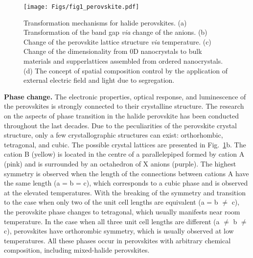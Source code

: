 \documentclass[journal=chreay,manuscript=review]{achemso}
\begin{document}
\begin{figure}[h!]
    \centering
    \texttt{[image: Figs/fig1\_perovskite.pdf]}
    \caption{
    Transformation mechanisms for halide perovskites. (a) Transformation of the band gap \textit{via} change of the anions. (b) Change of the perovskite lattice structure \textit{via} temperature. (c) Change of the dimensionality from 0D nanocrystals to bulk materials and supperlattices assembled from ordered nanocrystals. (d) The concept of spatial composition control by the application of external electric field and light due to segregation. %
    }
    \label{fig:pero1}
\end{figure}

%
\textbf{Phase change.}
The electronic properties, optical response, and luminescence of the perovskites is strongly connected to their crystalline structure. The research on the aspects of phase transition in the halide perovskite has been conducted throughout the last decades\cite{hirotsu1971experimental, hirotsu1974structural, hirotsu1978elastic, fujii1974neutron,tovborg1969nqr}. 
Due to the peculiarities of the perovskite crystal structure, only a few crystallographic structures can exist: orthorhombic, tetragonal, and cubic. 
The possible crystal lattices are presented in Fig.~\ref{fig:pero1}b. The cation B (yellow) is located in the centre of a parallelepiped formed by cation A (pink) and is surrounded by an octahedron of X anions (purple). The highest symmetry is observed when the length of the connections between cations A have the same length (a = b = c), which corresponds to a cubic phase and is observed at the elevated temperatures. With the breaking of the symmetry and transition to the case when only two of the unit cell lengths are equivalent (a = b $\neq$ c), the perovskite phase changes to tetragonal, which usually manifests near room temperature. In the case when all three unit cell lengths are different (a $\neq$ b $\neq$ c), perovskites have orthorombic symmetry, which is usually observed at low temperatures. 
All these phases occur in perovskites with arbitrary chemical composition, including mixed-halide perovskites. 
\end{document}
